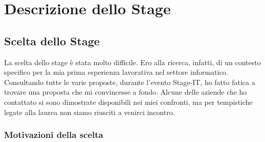 
\chapter{Descrizione dello Stage}
\label{cap:descrizione-stage}


\section{Scelta dello Stage}

La scelta dello stage è stata molto difficile. Ero alla ricerca, infatti, di un contesto specifico per la mia prima esperienza lavorativa
nel settore informatico. Consultando tutte le varie proposte, durante l'evento Stage-IT, ho fatto fatica a trovare una proposta che mi
convincesse a fondo. Alcune delle aziende che ho contattato si sono dimostrate disponibili nei miei confronti, ma per tempistiche legate
alla laurea non siamo riusciti a venirci incontro.

\subsection{Motivazioni della scelta}

